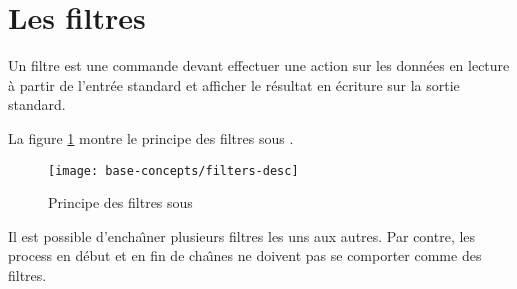 \section{\label{bcpts-filters}Les filtres}

Un filtre est une commande {\Unix} devant effectuer une action sur
les donn{\'e}es en lecture {\`a} partir de l'entr{\'e}e standard et afficher le
r{\'e}sultat en {\'e}criture sur la sortie standard.

La figure \ref{fig-bcpts-filters-desc} montre le principe des filtres sous
{\Unix}.

\begin{figure}[hbtp]
\centering
\texttt{[image: base-concepts/filters-desc]}
\caption{\label{fig-bcpts-filters-desc}Principe des filtres sous {\Unix}}
\end{figure}

Il est possible d'encha{\^\i}ner plusieurs filtres les uns aux autres. Par
contre, les process en d{\'e}but et en fin de cha{\^\i}nes ne doivent pas se
comporter comme des filtres.

